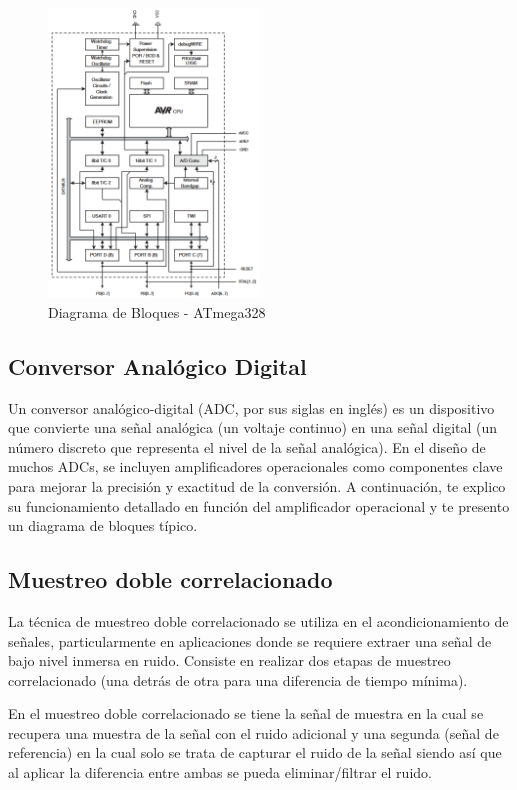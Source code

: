 \documentclass[conference]{IEEEtran}
\begin{document}
	\begin{figure}[h]
		\centering
		\includegraphics[width=0.5\textwidth]{media/esquema-atmega328}
		\caption{Diagrama de Bloques - ATmega328}
		\label{fig:esquema-atmega328}
	\end{figure}
	
	\subsection{Conversor Analógico Digital}
	Un conversor analógico-digital (ADC, por sus siglas en inglés) es un dispositivo que convierte una señal analógica (un voltaje continuo) en una señal digital (un número discreto que representa el nivel de la señal analógica). En el diseño de muchos ADCs, se incluyen amplificadores operacionales como componentes clave para mejorar la precisión y exactitud de la conversión. A continuación, te explico su funcionamiento detallado en función del amplificador operacional y te presento un diagrama de bloques típico.
	
	\subsection{Muestreo doble correlacionado}
	La técnica de muestreo doble correlacionado se utiliza en el acondicionamiento de señales, particularmente en aplicaciones donde se requiere extraer una señal de bajo nivel inmersa en ruido. Consiste en realizar dos etapas de muestreo correlacionado (una detrás de otra para una diferencia de tiempo mínima).
	
	En el muestreo doble correlacionado se tiene la señal de muestra en la cual se recupera una muestra de la señal con el ruido adicional y una segunda (señal de referencia) en la cual solo se trata de capturar el ruido de la señal siendo así que al aplicar la diferencia entre ambas se pueda eliminar/filtrar el ruido.
	
\end{document}
